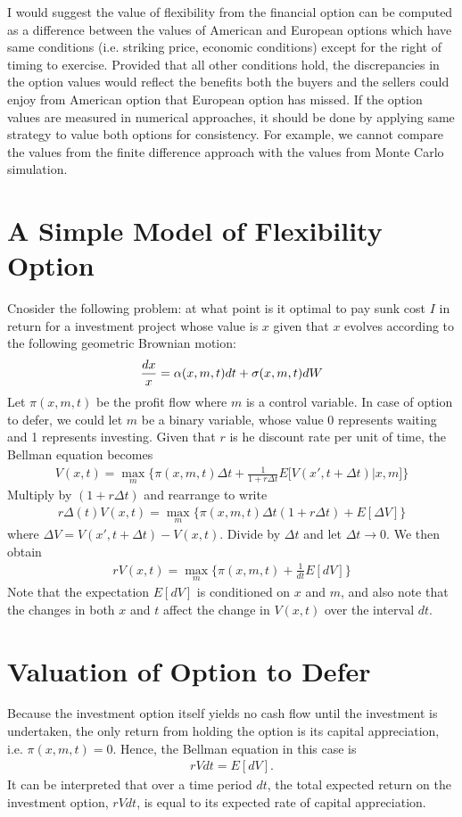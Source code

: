 \documentclass[11pt,letter]{article}
\def\a{\alpha} \def\b{\beta} \def\g{\gamma} \def\d{\delta} \def\r{\rho}
\def\D{\Delta} \def\G{\Gamma} \def\W{\Omega} \def\P{\Phi} \def\L{\Lambda} \def\Th{\Theta} \def\z{\zeta}
\theoremstyle{definition}
\theoremstyle{remark}
\numberwithin{equation}{section}
\begin{document}
I would suggest the value of flexibility from the financial option can be computed as a difference between the values of American and European options which have same conditions (i.e. striking price, economic conditions) except for the right of timing to exercise. Provided that all other conditions hold, the discrepancies in the option values would reflect the benefits both the buyers and the sellers could enjoy from American option that European option has missed. If the option values are measured in numerical approaches, it should be done by applying same strategy to value both options for consistency. For example, we cannot compare the values from the finite difference approach with the values from Monte Carlo simulation.


\section{A Simple Model of Flexibility Option}
Cnosider the following problem: at what point is it optimal to pay sunk cost $I$ in return for a investment project whose value is $x$ given that $x$ evolves according to the following geometric Brownian motion:
\begin{align}
    \frac{dx}{x}=\a(x,m,t)dt+\s(x,m,t)dW
\end{align}
Let $\pi(x,m,t)$ be the profit flow where $m$ is a control variable. In case of option to defer, we could let $m$ be a binary variable, whose value 0 represents waiting and 1 represents investing. Given that $r$ is he discount rate per unit of time, the Bellman equation becomes
\begin{align}
    V(x,t)=\max_m\Big\{\pi(x,m,t)\D t+\frac{1}{1+r\D t}E\Big[V(x',t+\D t)\Big|x,m\Big]\Big\}
\end{align}
Multiply by $(1+r\D t)$ and rearrange to write
\begin{align*}
    r\D(t)V(x,t)=\max_m\Big\{\pi(x,m,t)\D t(1+r\D t)+E[\D V]\Big\}
\end{align*}
where $\D V=V(x',t+\D t)-V(x,t)$. Divide by $\D t$ and let $\D t\rightarrow0$. We then obtain
\begin{align}
    rV(x,t)=\max_m\Big\{\pi(x,m,t)+\frac{1}{dt}E[dV]\Big\}
\end{align}
Note that the expectation $E[dV]$ is conditioned on $x$ and $m$, and also note that the changes in both $x$ and $t$ affect the change in $V(x,t)$ over the interval $dt$.


\section{Valuation of Option to Defer}
Because the investment option itself yields no cash flow until the investment is undertaken, the only return from holding the option is its capital appreciation, i.e. $\pi(x,m,t)=0$. Hence, the Bellman equation in this case is
\begin{align}
    rVdt=E[dV].
\end{align}
It can be interpreted that over a time period $dt$, the total expected return on the investment option, $rVdt$, is equal to its expected rate of capital appreciation.
\end{document}
